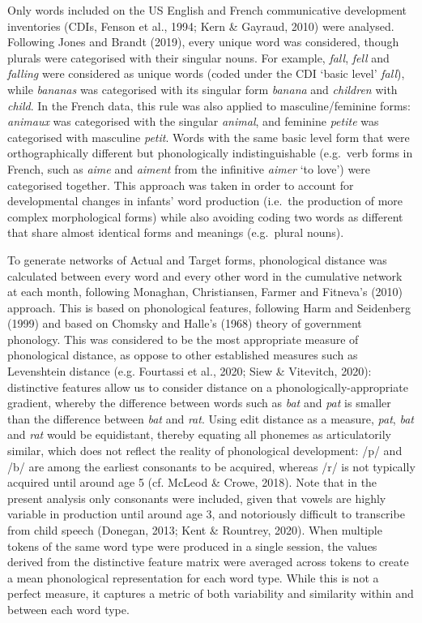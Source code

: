 \documentclass[
  man,mask,floatsintext]{apa6}
\begin{document}
Only words included on the US English and French communicative development inventories (CDIs, Fenson et al., 1994; Kern \& Gayraud, 2010) were analysed. Following Jones and Brandt (2019), every unique word was considered, though plurals were categorised with their singular nouns. For example, \emph{fall}, \emph{fell} and \emph{falling} were considered as unique words (coded under the CDI `basic level' \emph{fall}), while \emph{bananas} was categorised with its singular form \emph{banana} and \emph{children} with \emph{child}. In the French data, this rule was also applied to masculine/feminine forms: \emph{animaux} was categorised with the singular \emph{animal}, and feminine \emph{petite} was categorised with masculine \emph{petit}. Words with the same basic level form that were orthographically different but phonologically indistinguishable (e.g.~verb forms in French, such as \emph{aime} and \emph{aiment} from the infinitive \emph{aimer} `to love') were categorised together. This approach was taken in order to account for developmental changes in infants' word production (i.e.~the production of more complex morphological forms) while also avoiding coding two words as different that share almost identical forms and meanings (e.g.~plural nouns).

To generate networks of Actual and Target forms, phonological distance was calculated between every word and every other word in the cumulative network at each month, following Monaghan, Christiansen, Farmer and Fitneva's (2010) approach. This is based on phonological features, following Harm and Seidenberg (1999) and based on Chomsky and Halle's (1968) theory of government phonology. This was considered to be the most appropriate measure of phonological distance, as oppose to other established measures such as Levenshtein distance (e.g. Fourtassi et al., 2020; Siew \& Vitevitch, 2020): distinctive features allow us to consider distance on a phonologically-appropriate gradient, whereby the difference between words such as \emph{bat} and \emph{pat} is smaller than the difference between \emph{bat} and \emph{rat}. Using edit distance as a measure, \emph{pat}, \emph{bat} and \emph{rat} would be equidistant, thereby equating all phonemes as articulatorily similar, which does not reflect the reality of phonological development: /p/ and /b/ are among the earliest consonants to be acquired, whereas /r/ is not typically acquired until around age 5 (cf. McLeod \& Crowe, 2018). Note that in the present analysis only consonants were included, given that vowels are highly variable in production until around age 3, and notoriously difficult to transcribe from child speech (Donegan, 2013; Kent \& Rountrey, 2020). When multiple tokens of the same word type were produced in a single session, the values derived from the distinctive feature matrix were averaged across tokens to create a mean phonological representation for each word type. While this is not a perfect measure, it captures a metric of both variability and similarity within and between each word type.
\end{document}

